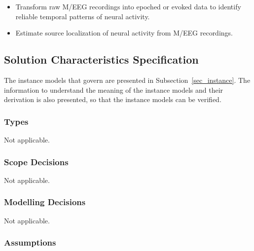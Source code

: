 \documentclass[12pt]{article}
\newcounter{goalnum} %
\begin{document}
\begin{itemize}

    \item[GS\refstepcounter{goalnum}\thegoalnum \label{G_sensorSpace}:] 
    Transform raw M/EEG recordings into epoched or evoked data to identify reliable temporal patterns of neural activity.

    \item[GS\refstepcounter{goalnum}\thegoalnum \label{G_sourceLocalization}:] Estimate source localization of neural activity from M/EEG recordings.


\end{itemize}




\subsection{Solution Characteristics Specification}


The instance models that govern \progname{} are presented in Subsection~\ref{sec_instance}.  The information to understand the meaning of the instance models and their derivation is also presented, so that the instance models can be verified.




\subsubsection{Types}
Not applicable.




\subsubsection{Scope Decisions}
Not applicable.




\subsubsection{Modelling Decisions}
Not applicable.




\subsubsection{Assumptions} \label{sec_assumpt}
\end{document}
